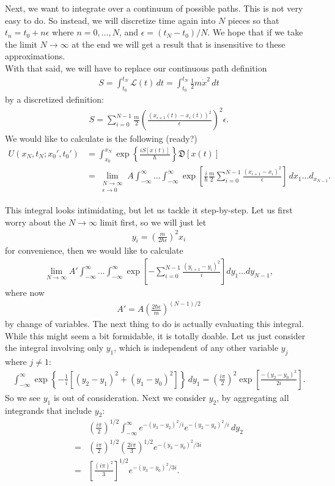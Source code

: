 \documentclass{book}
\theoremstyle{definition}
\newcommand{\lag}{\mathcal{L}}
\newcommand{\f}[2]{\frac{#1}{#2}}
\newcommand{\lp}{\left(}
\newcommand{\rp}{\right)}
\newcommand{\lb}{\left[}
\newcommand{\rb}{\right]}
\newcommand{\lc}{\left\{}
\newcommand{\rc}{\right\}}
\begin{document}
Next, we want to integrate over a continuum of possible paths. This is not very easy to do. So instead, we will discretize time again into $N$ pieces so that $t_n = t_0 + n\epsilon$ where $n = 0,\dots,N$, and $\epsilon = (t_N - t_0)/N$. We hope that if we take the limit $N \to \infty$ at the end we will get a result that is insensitive to these approximations.\\

With that said, we will have to replace our continuous path definition
\begin{align}
S = \int_{t_0}^{t_N} \lag(t)\,dt = \int_{t_0}^{t_N} \f{1}{2}m\dot{x}^2\,dt
\end{align}
by a discretized definition:
\begin{align}
S = \sum^{N-1}_{i=0} \f{m}{2}\lp  \f{(x_{i+1}(t) - x_i(t))^2}{\epsilon}\rp^2 \epsilon.
\end{align}
We would like to calculate is the following (ready?)
\begin{align}
U(x_N,t_N;x_0',t_0') &= \int_{x_0}^{x_N} \exp\lc \f{iS[x(t)]}{\hbar} \rc\mathfrak{D}[x(t)] \\ 
&= \lim_{\substack{N\to\infty \\ \epsilon\to 0}} A \int_{-\infty}^{\infty} \dots \int_{-\infty}^{\infty} \exp\lb \f{i}{\hbar}\f{m}{2}\sum_{i=0}^{N-1} \f{(x_{i+1} - x_i)^2}{\epsilon} \rb\, dx_1\dots d_{x_{N-1}}.
\end{align}


This integral looks intimidating, but let us tackle it step-by-step. Let us first worry about the $N\to \infty$ limit first, so we will just let
\begin{align}
y_i = \lp \f{m}{2\hbar\epsilon}\rp^2 x_i
\end{align}
for convenience, then we would like to calculate
\begin{align}
\lim_{N \to \infty} A' \int_{-\infty}^{\infty} \dots \int_{-\infty}^{\infty} \exp \lb -\sum_{i=0}^{N-1} \f{(y_{i+1} - y_i)^2}{i} \rb dy_1\dots dy_{N-1},
\end{align}
where now
\begin{align}
A' = A\lp \f{2\hbar\epsilon}{m}\rp^{(N-1)/2}
\end{align}
by change of variables. The next thing to do is actually evaluating this integral. While this might seem a bit formidable, it is totally doable. Let us just consider the integral involving only $y_1$, which is independent of any other variable $y_j$ where $j\neq 1$:
\begin{align}
\int_{-\infty}^\infty    \exp \lc -\f{1}{i}\lb (y_2 - y_1)^2 + (y_1 - y_0)^2 \rb  \rc\,dy_1  = \lp \f{i\pi}{2} \rp^2 \exp \lb \f{-(y_2 - y_0)^2}{2i} \rb.
\end{align}
So we see $y_1$ is out of consideration. Next we consider $y_2$, by aggregating all integrands that include $y_2$:
\begin{align}
&\lp \f{i\pi}{2} \rp^{1/2} \int^\infty_{-\infty} e^{-(y_3 - y_2)^2/i}e^{-(y_2 - y_0)^2/i} \,dy_2\\
=& \lp \f{i\pi}{2} \rp^{1/2} \lp \f{2i\pi}{3} \rp^{1/2} e^{-(y_3 - y_0)^2 / 3i}\\
=& \lb \f{(i\pi)^2}{3} \rb^{1/2} e^{-(y_3 - y_0)^2 / 3i}.
\end{align}
\end{document}

